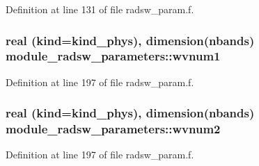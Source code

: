 Definition at line 131 of file radsw\+\_\+param.\+f.

\subsubsection[{\texorpdfstring{wvnum1}{wvnum1}}]{\setlength{\rightskip}{0pt plus 5cm}real (kind=kind\+\_\+phys), dimension(nbands) module\+\_\+radsw\+\_\+parameters\+::wvnum1}\hypertarget{group__module__radsw__main_gadc7827bd2bed6502a0a60b40b8f1deeb}{}\label{group__module__radsw__main_gadc7827bd2bed6502a0a60b40b8f1deeb}


Definition at line 197 of file radsw\+\_\+param.\+f.

\subsubsection[{\texorpdfstring{wvnum2}{wvnum2}}]{\setlength{\rightskip}{0pt plus 5cm}real (kind=kind\+\_\+phys), dimension(nbands) module\+\_\+radsw\+\_\+parameters\+::wvnum2}\hypertarget{group__module__radsw__main_ga88594ac7d3fbf13f2fdbac4b3b844d88}{}\label{group__module__radsw__main_ga88594ac7d3fbf13f2fdbac4b3b844d88}


Definition at line 197 of file radsw\+\_\+param.\+f.

